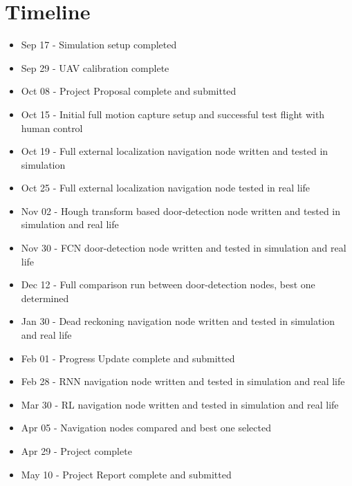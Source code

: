 \documentclass[12pt]{article}
\begin{document}
\section{Timeline}
\begin{itemize}
	\item Sep 17 - Simulation setup completed
	\item Sep 29 - UAV calibration complete
	\item Oct 08 - Project Proposal complete and submitted
	\item Oct 15 - Initial full motion capture setup and successful test flight with human control
	\item Oct 19 - Full external localization navigation node written and tested in simulation
	\item Oct 25 - Full external localization navigation node tested in real life
	\item Nov 02 - Hough transform based door-detection node written and tested in simulation and real life
	\item Nov 30 - FCN door-detection node written and tested in simulation and real life
	\item Dec 12 - Full comparison run between door-detection nodes, best one determined 
	\item Jan 30 - Dead reckoning navigation node written and tested in simulation and real life
	\item Feb 01 - Progress Update complete and submitted
	\item Feb 28 - RNN navigation node written and tested in simulation and real life
	\item Mar 30 - RL navigation node written and tested in simulation and real life
	\item Apr 05 - Navigation nodes compared and best one selected
	\item Apr 29 - Project complete
	\item May 10 - Project Report complete and submitted
\end{itemize}

\end{document}

